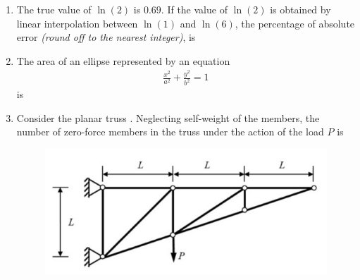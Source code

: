 \documentclass[journal]{IEEEtran}
\begin{document}
\begin{enumerate}
\begin{enumerate}

\end{enumerate}

\item The true value of $\ln(2)$ is $0.69$. If the value of $\ln(2)$ is obtained by linear interpolation between $\ln(1)$ and $\ln(6)$, the percentage of absolute error \emph{(round off to the nearest integer)}, is  \hfill {}

\begin{enumerate}

\end{enumerate}

\item The area of an ellipse represented by an equation 
\begin{align}
\displaystyle \frac{x^2}{a^2} + \frac{y^2}{b^2} = 1 
\end{align} is \hfill {}

\begin{enumerate}
 
\end{enumerate}

\item Consider the planar truss . Neglecting self-weight of the members, the number of zero-force members in the truss under the action of the load $P$ is \hfill {}

\begin{figure}[H]
    \centering
    \includegraphics[width=0.3\columnwidth]{figs/Q15.png} 
    \caption{}
    \label{fig:placeholder}
\end{figure}


\end{enumerate}
\end{document}
